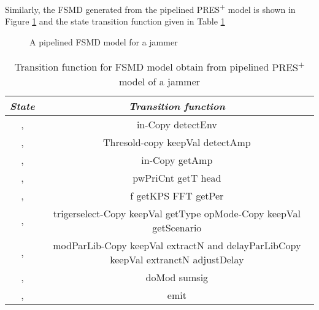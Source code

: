 \documentclass[9pt,executive]{article}
\def\presp{PRES\textsuperscript{+}}
\def\fsmd{FSMD}
\def\presp{PRES\textsuperscript{+}}
\def\fsmd{FSMD}
\begin{document}
Similarly, the {\fsmd} generated from the pipelined {\presp} model  is shown in Figure \ref{fig:pjammer} and the 
state transition function given in Table \ref{F:comp3}
\begin{figure}[htbp]
\centerline{}
\caption{A pipelined {\fsmd} model for a jammer}
\label{fig:pjammer}
\end{figure}

\begin{table}[t]
  \begin{center}
    \small

\begin{tabular}{|c|c|} \hline 
\emph{State}                           & \emph{Transition function}              \\
              
\hline
 ,           &  in-Copy  detectEnv                                                                          \\ 
 \hline                                              
 ,           &  Thresold-copy  keepVal  detectAmp                                                                 \\ 
\hline
 ,           &   in-Copy  getAmp                                                                                   \\  
\hline
 ,           &  pwPriCnt  getT  head                                                                                \\    
\hline
 ,           &  f  getKPS  FFT  getPer                                                                              \\             
\hline
 ,           &trigerselect-Copy  keepVal  getType  opMode-Copy  keepVal  getScenario                            \\ 
\hline
 ,           &modParLib-Copy  keepVal  extractN  and delayParLibCopy  keepVal extranctN  adjustDelay         \\ 
\hline
 ,           &  doMod  sumsig                                                                                                       \\
\hline 
 ,           & emit \\
\hline
\end{tabular}
\end{center}
\caption{Transition function for {\fsmd} model obtain from pipelined {\presp} model of a jammer}
\label{F:comp3}
\end{table}
\clearpage
\end{document}
